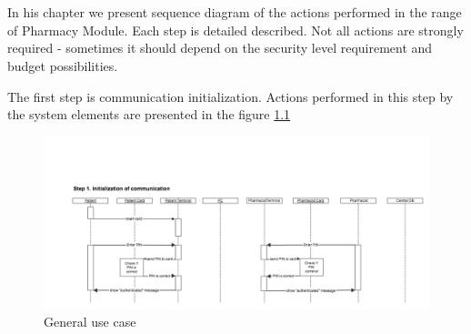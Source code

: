 \chapter{   }
In his chapter we present sequence diagram of the actions performed in the range of Pharmacy Module. Each step is detailed described. Not all actions are strongly required - sometimes it should depend on the security level requirement and budget possibilities. 

The first step is communication initialization. Actions performed in this step by the system elements are presented in the figure \ref{fig:s_q_step_1}
\begin{figure}
    \centering
    \includegraphics[width=1\textwidth]{s_d_1.png}
    \caption{General use case}
    \label{fig:s_q_step_1}
\end{figure} 
